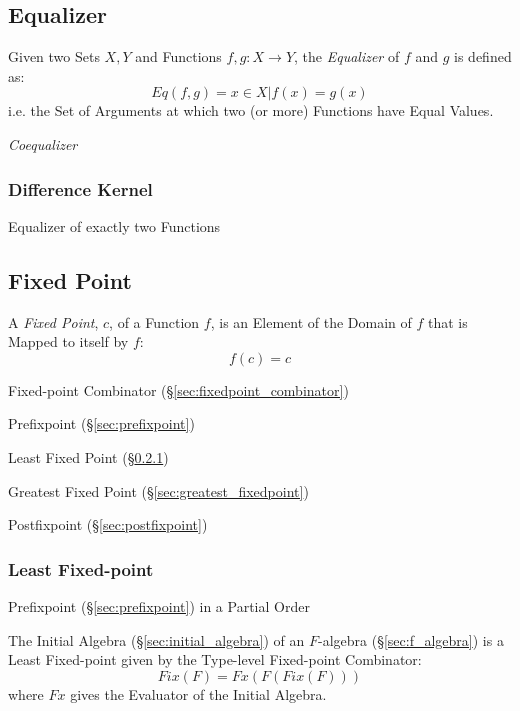 \subsection{Equalizer}\label{sec:function_equalizer}

Given two Sets $X,Y$ and Functions $f,g : X \rightarrow Y$, the
\emph{Equalizer} of $f$ and $g$ is defined as:
\[
  Eq(f,g) = { x \in X | f(x) = g(x) }
\]
i.e. the Set of Arguments at which two (or more) Functions have Equal
Values.


\emph{Coequalizer}



\subsubsection{Difference Kernel}\label{sec:difference_equalizer}

Equalizer of exactly two Functions



\subsection{Fixed Point}\label{sec:fixed_point}

A \emph{Fixed Point}, $c$, of a Function $f$, is an Element of the
Domain of $f$ that is Mapped to itself by $f$:
\[
  f(c) = c
\]

Fixed-point Combinator (\S\ref{sec:fixedpoint_combinator})

Prefixpoint (\S\ref{sec:prefixpoint})

Least Fixed Point (\S\ref{sec:least_fixedpoint})

Greatest Fixed Point (\S\ref{sec:greatest_fixedpoint})

Postfixpoint (\S\ref{sec:postfixpoint})



\subsubsection{Least Fixed-point}\label{sec:least_fixedpoint}

Prefixpoint (\S\ref{sec:prefixpoint}) in a Partial Order

The Initial Algebra (\S\ref{sec:initial_algebra}) of an $F$-algebra
(\S\ref{sec:f_algebra}) is a Least Fixed-point given by the Type-level
Fixed-point Combinator:
\[
  Fix (F) = Fx(F (Fix (F)))
\]
where $Fx$ gives the Evaluator of the Initial Algebra.



